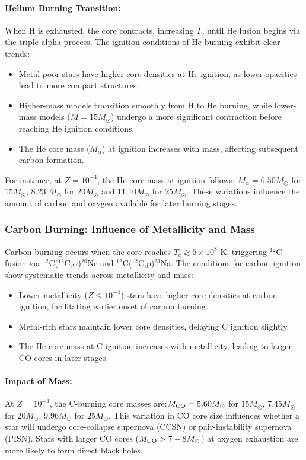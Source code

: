 \paragraph{Helium Burning Transition:}
When H is exhausted, the core contracts, increasing $T_c$ until He fusion begins via the triple-alpha process. The ignition conditions of He burning exhibit clear trends:
\begin{itemize}
    \item  Metal-poor stars have higher core densities at He ignition, as lower opacities lead to more compact structures.
    \item Higher-mass models transition smoothly from H to He burning, while lower-mass models ($M = 15 M_\odot$) undergo a more significant contraction before reaching He ignition conditions.
    \item The He core mass ($M_{\alpha}$) at ignition increases with mass, affecting subsequent carbon formation.
\end{itemize}

For instance, at $Z = 10^{-4}$, the He core mass at ignition follows: $M_{\alpha} = 6.50 M_\odot$ for $15 M_\odot$, 8.23 $M_\odot$ for $20 M_\odot$ and 11.10$M_\odot$ for $25 M_\odot$. These variations influence the amount of carbon and oxygen available for later burning stages.

\subsubsection{Carbon Burning: Influence of Metallicity and Mass}

Carbon burning occurs when the core reaches $T_c \gtrsim 5 \times 10^8$ K, triggering $^{12}$C fusion via $^{12}$C($^{12}$C,$\alpha$)$^{20}$Ne and $^{12}$C($^{12}$C,p)$^{23}$Na. The conditions for carbon ignition show systematic trends across metallicity and mass:

\begin{itemize}
    \item Lower-metallicity ($Z \leq 10^{-4}$) stars have higher core densities at carbon ignition, facilitating earlier onset of carbon burning.
    \item Metal-rich stars maintain lower core densities, delaying C ignition slightly.
    \item The He core mass at C ignition increases with metallicity, leading to larger CO cores in later stages.
\end{itemize}

\paragraph{Impact of Mass:}
At $Z = 10^{-3}$, the C-burning core masses are:$M_{\rm CO} = 5.60 M_\odot$ for $15 M_\odot$, 7.45$M_\odot$ for $20 M_\odot$, 9.96$M_\odot$ for $25 M_\odot$. This variation in CO core size influences whether a star will undergo core-collapse supernova (CCSN) or pair-instability supernova (PISN). Stars with larger CO cores ($M_{\rm CO} > 7-8 M_\odot$) at oxygen exhaustion are more likely to form direct black holes.


